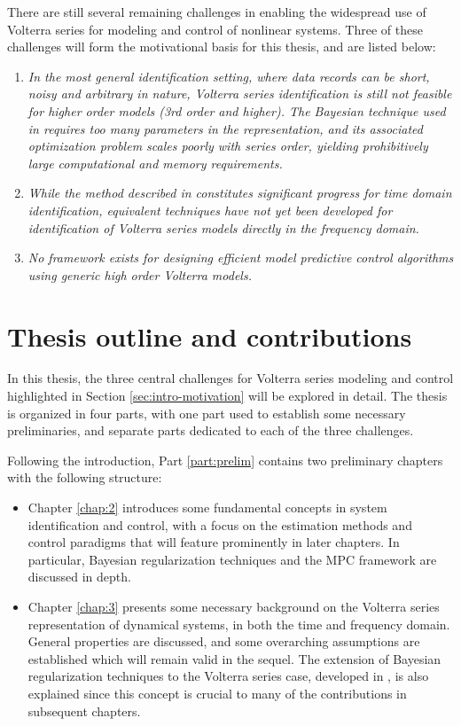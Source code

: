 There are still several remaining challenges in enabling the widespread use of Volterra series for modeling and control of nonlinear systems. Three of these challenges will form the motivational basis for this thesis, and are listed below:
\begin{enumerate}
\item \emph{In the most general identification setting, where data records can be short, noisy and arbitrary in nature, Volterra series identification is still not feasible for higher order models (3rd order and higher). The Bayesian technique used in \cite{Birpoutsoukis2017} requires too many parameters in the representation, and its associated optimization problem scales poorly with series order, yielding prohibitively large computational and memory requirements.}
\item \emph{While the method described in \cite{Birpoutsoukis2017} constitutes significant progress for time domain identification, equivalent techniques have not yet been developed for identification of Volterra series models directly in the frequency domain.}
\item \emph{No framework exists for designing efficient model predictive control algorithms using generic high order Volterra models.}
\end{enumerate}

\section{Thesis outline and contributions}

In this thesis, the three central challenges for Volterra series modeling and control highlighted in Section \ref{sec:intro-motivation} will be explored in detail. The thesis is organized in four parts, with one part used to establish some necessary preliminaries, and separate parts dedicated to each of the three challenges.

Following the introduction, Part \ref{part:prelim} contains two preliminary chapters with the following structure:
\begin{itemize}
\item Chapter \ref{chap:2} introduces some fundamental concepts in system identification and control, with a focus on the estimation methods and control paradigms that will feature prominently in later chapters. In particular, Bayesian regularization techniques and the MPC framework are discussed in depth.
\item Chapter \ref{chap:3} presents some necessary background on the Volterra series representation of dynamical systems, in both the time and frequency domain. General properties are discussed, and some overarching assumptions are established which will remain valid in the sequel. The extension of Bayesian regularization techniques to the Volterra series case, developed in \cite{Birpoutsoukis2017}, is also explained since this concept is crucial to many of the contributions in subsequent chapters.  
\end{itemize}

